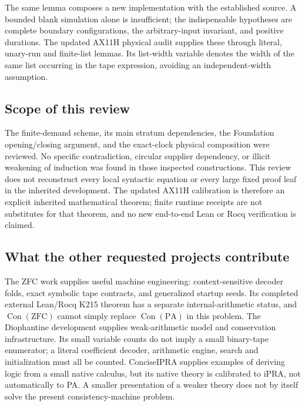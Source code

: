 The same lemma composes a new implementation with the established source.
A bounded blank simulation alone is insufficient; the indispensable
hypotheses are complete boundary configurations, the arbitrary-input
invariant, and positive durations. The updated AX11H physical audit
supplies these through literal, unary-run and finite-list lemmas.
Its list-width variable denotes the width of the same list occurring in
the tape expression, avoiding an independent-width assumption.

\subsection{Scope of this review}

The finite-demand scheme, its main stratum dependencies, the Foundation
opening/closing argument, and the exact-clock physical composition were
reviewed. No specific contradiction, circular supplier dependency, or
illicit weakening of induction was found in those inspected constructions.
This review does not reconstruct every local syntactic equation or every
large fixed proof leaf in the inherited development. The updated AX11H
calibration is therefore an explicit inherited mathematical theorem;
finite runtime receipts are not substitutes for that theorem, and no new
end-to-end Lean or Rocq verification is claimed.

\subsection{What the other requested projects contribute}

The ZFC work supplies useful machine engineering: context-sensitive
decoder folds, exact symbolic tape contracts, and generalized startup
seeds. Its completed external Lean/Rocq K215 theorem has a separate
internal-arithmetic status, and $\operatorname{Con}(\mathrm{ZFC})$
cannot simply replace $\operatorname{Con}(\mathrm{PA})$ in this problem.
The Diophantine development supplies weak-arithmetic model and
conservation infrastructure. Its small variable counts do not imply a
small binary-tape enumerator; a literal coefficient decoder, arithmetic
engine, search and initialization must all be counted.
ConciseIPRA supplies examples of deriving logic from a small native
calculus, but its native theory is calibrated to iPRA, not automatically
to PA. A smaller presentation of a weaker theory does not by itself solve
the present consistency-machine problem.

